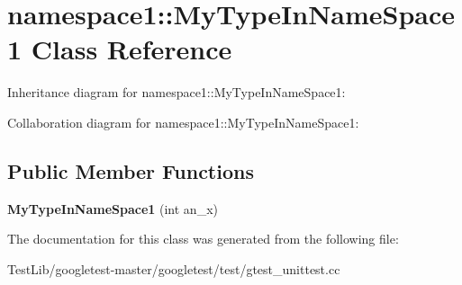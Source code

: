 \hypertarget{classnamespace1_1_1MyTypeInNameSpace1}{}\section{namespace1\+:\+:My\+Type\+In\+Name\+Space1 Class Reference}
\label{classnamespace1_1_1MyTypeInNameSpace1}


Inheritance diagram for namespace1\+:\+:My\+Type\+In\+Name\+Space1\+:


Collaboration diagram for namespace1\+:\+:My\+Type\+In\+Name\+Space1\+:
\subsection*{Public Member Functions}
\begin{DoxyCompactItemize}
\item 
\mbox{\label{classnamespace1_1_1MyTypeInNameSpace1_a2e4277aa118e9b83045a18392188a0d8}} 
{\bfseries My\+Type\+In\+Name\+Space1} (int an\+\_\+x)
\end{DoxyCompactItemize}


The documentation for this class was generated from the following file\+:\begin{DoxyCompactItemize}
\item 
Test\+Lib/googletest-\/master/googletest/test/gtest\+\_\+unittest.\+cc\end{DoxyCompactItemize}

